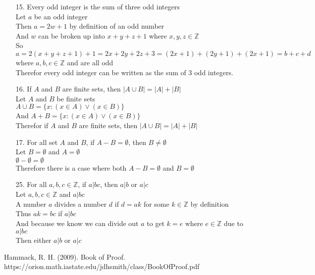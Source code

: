 \documentclass[sigconf]{article}
\begin{document}
\begin{itemize}
  \item[15.] Every odd integer is the sum of three odd integers\\ %
            Let $a$ be an odd integer\\
            Then $a=2w+1$ by definition of an odd number\\
            And $w$ can be broken up into $x+y+z+1$ where $x,y,z\in\mathbb{Z}$\\
            So $a=2(x+y+z+1)+1=2x+2y+2z+3=(2x+1)+(2y+1)+(2x+1)=b+c+d$ where $a,b,c\in\mathbb{Z}$ and are all odd\\
            Therefor every odd integer can be written as the sum of 3 odd integers.

  \item[16.] If $A$ and $B$ are finite sets, then $|A\cup B|=|A|+|B|$\\ %
            Let $A$ and $B$ be finite sets\\
            $A\cup B=\{x:(x\in A)\lor(x\in B)\}$\\
            And $A+B=\{x:(x\in A)\lor(x\in B)\}$\\
            Therefor if $A$ and $B$ are finite sets, then $|A\cup B|=|A|+|B|$


  \item[17.] For all set $A$ and $B$, if $A-B=\emptyset$, then $B\neq\emptyset$\\ %
            Let $B=\emptyset$ and $A=\emptyset$\\
            $\emptyset - \emptyset = \emptyset$\\
            Therefore there is a case where both $A-B=\emptyset$ and $B=\emptyset$

  \item[25.] For all $a,b,c\in\mathbb{Z}$, if $a|bc$, then $a|b$ or $a|c$\\ %
            Let $a,b,c\in\mathbb{Z}$ and $a|bc$\\
            A number $a$ divides a number $d$ if $d=ak$ for some $k\in\mathbb{Z}$ by definition\\
            Thus $ak=bc$ if $a|bc$\\
            And because we know we can divide out $a$ to get $k=e$ where $e\in\mathbb{Z}$ due to $a|bc$\\
            Then either $a|b$ or $a|c$
\end{itemize}


Hammack, R. H. (2009). Book of Proof.\\ https://orion.math.iastate.edu/jdhsmith/class/BookOfProof.pdf



\end{document}
